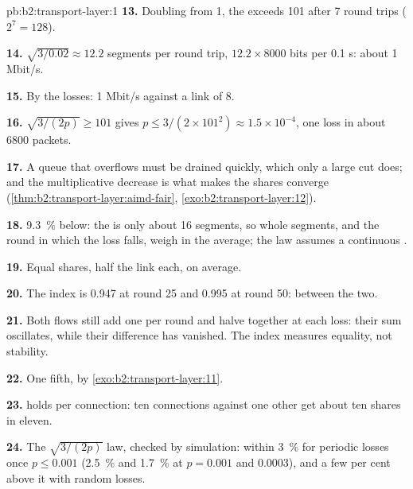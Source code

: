 \begin{solution}{pb:b2:transport-layer:1}
\textbf{13.} Doubling from 1, the  exceeds 101 after 7 round trips ($2^7 = 128$).

\textbf{14.} $\sqrt{3/0.02} \approx 12.2$ segments per round trip, $12.2 \times 8000$ bits per 0.1 s: about 1 Mbit/s.

\textbf{15.} By the losses: 1 Mbit/s against a link of 8.

\textbf{16.} $\sqrt{3/(2p)} \ge 101$ gives $p \le 3/(2 \times 101^2) \approx 1.5 \times 10^{-4}$, one loss in about
6800 packets.

\textbf{17.} A queue that overflows must be drained quickly, which only a large cut does; and the multiplicative
decrease is what makes the shares converge (\cref{thm:b2:transport-layer:aimd-fair},
\cref{exo:b2:transport-layer:12}).

\textbf{18.} 9.3~\% below: the  is only about 16 segments, so whole segments, and the round in which the loss
falls, weigh in the average; the law assumes a continuous .

\textbf{19.} Equal shares, half the link each, on average.

\textbf{20.} The index is 0.947 at round 25 and 0.995 at round 50: between the two.

\textbf{21.} Both flows still add one per round and halve together at each loss: their sum oscillates, while their
difference has vanished. The index measures equality, not stability.

\textbf{22.} One fifth, by \cref{exo:b2:transport-layer:11}.

\textbf{23.}  holds per connection: ten connections against one other get about ten shares in eleven.

\textbf{24.} The $\sqrt{3/(2p)}$ law, checked by simulation: within 3~\% for periodic losses once $p \le 0.001$
(2.5~\% and 1.7~\% at $p = 0.001$ and $0.0003$), and a few per cent above it with random losses.
\end{solution}
